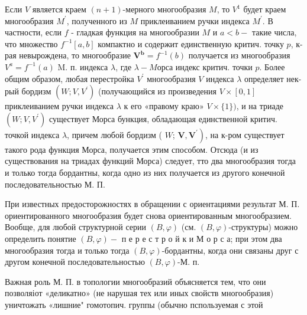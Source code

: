 \documentclass[10pt]{article}
\begin{document}
Если $V$ является краем $(n+1)$-мерного многообразия $M$, то $V^{1}$ будет краем многообразия $M^{\prime}$, полученного из $M$ приклеиванием ручки индекса $M^{\prime}$. В частности, если $f$ - гладкая функция на многообразии $M$ и $a<b-$ такие числа, что множество $f^{-1}[a, b]$ компактно и содержит единственную критич. точку $p$, к-рая невырождена, то многообразие $\boldsymbol{V}^{\boldsymbol{b}}=f^{-1}(b)$ получается из многообразия $V^{a}=f^{-1}(a)$ M. п. индекса $\lambda$, где $\lambda-M о р с а$ индекс критич. точки $p$. Более общим образом, любая перестройка $V^{\prime}$ многообразия $V$ индекса $\lambda$ определяет нек-рый бордизм $\left(W ; V, V^{\prime}\right)$ (получающийся из произведения $V \times[0,1]$ приклеиванием ручки индекса $\lambda$ к его «правому краю» $V \times\{1\})$, и на триаде $\left(W ; V, V^{\prime}\right)$ существует Морса бункция, обладающая единственной критич. точкой индекса $\lambda$, причем любой бордизм ( $W$; $\left.\boldsymbol{V}, \boldsymbol{V}^{\prime}\right)$, на к-ром существует такого рода функция Морса, получается этим способом. Отсюда (и из существования на триадах функций Морса) следует, тто два многообразия тогда и только тогда бордантны, когда одно из них получается из другого конечной последовательностью М. П.



При известных предосторожностях в обращении с ориентациями результат М. П. ориентированного многообразия будет снова ориентированным многообразием. Вообще, для любой структурной серии $(B, \varphi)$ (см. $(B, \varphi)$-структуры) можно определить понятие $(B, \varphi)-$ п е р е с т р о й к и М о р с а; при этом два многообразия тогда и только тогда $(B, \varphi)$-бордантны, когда они связаны друг с другом конечной последовательностью $(B, \varphi)$-М. п.



Важная роль М. П. в топологии многообразий объясняется тем, что они позволяіот «деликатно» (не нарушая тех или иных свойств многообразия) уничтожать «лишние" гомотопич. группы (обычно пспользуемая с этой
\end{document}
